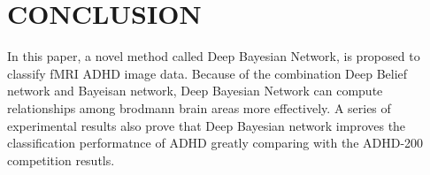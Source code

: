 \documentclass{article}
\begin{document}
\section{CONCLUSION}
In this paper, a novel method called Deep Bayesian Network, is proposed to classify fMRI ADHD image data. Because of the combination Deep Belief network and Bayeisan network, Deep Bayesian Network can compute relationships among brodmann brain areas more effectively. A series of experimental results also prove that Deep Bayesian network  improves the classification performatnce of ADHD greatly comparing with the ADHD-200 competition resutls. 







\end{document}
